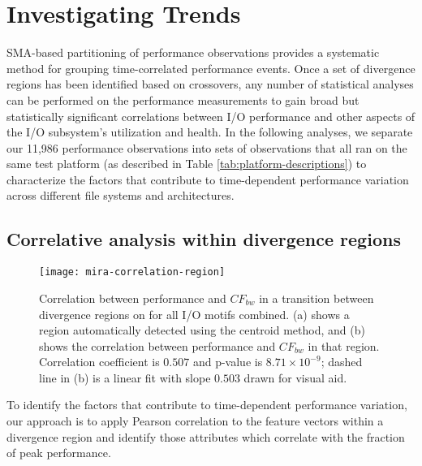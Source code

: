 \section{Investigating Trends}\label{sec:results}

SMA-based partitioning of performance observations provides a systematic method for grouping time-correlated performance events.
Once a set of divergence regions has been identified based on crossovers, any number of statistical analyses can be performed on the performance measurements to gain broad but statistically significant correlations between I/O performance and other aspects of the I/O subsystem's utilization and health.
In the following analyses, we separate our 11,986 performance observations into sets of observations that all ran on the same test platform (as described in Table \ref{tab:platform-descriptions}) to characterize the factors that contribute to time-dependent performance variation across different file systems and architectures.

\subsection{Correlative analysis within divergence regions} \label{sec:results/correlate-mira}

\begin{figure}
    \centering
    \texttt{[image: mira-correlation-region]}
    \vspace{-.35in}
    \caption{Correlation between performance and $CF_{bw}$ in a transition between divergence regions on \mira for all I/O motifs combined.
    (a) shows a region automatically detected using the centroid method, and (b) shows the correlation between performance and $CF_{bw}$ in that region.
    Correlation coefficient is $0.507$ and p-value is ${8.71 \times 10^{-9}}$; dashed line in (b) is a linear fit with slope $0.503$ drawn for visual aid.}
    \label{fig:mira-correlation-region}
\end{figure}


To identify the factors that contribute to time-dependent performance variation, our approach is to apply Pearson correlation to the feature vectors within a divergence region and identify those attributes which correlate with the fraction of peak performance.

